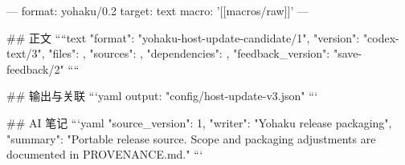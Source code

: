 ---
format: yohaku/0.2
target: text
macro: '[[macros/raw]]'
---

## 正文
````text
{
  "format": "yohaku-host-update-candidate/1",
  "version": "codex-text/3",
  "files": {},
  "sources": {},
  "dependencies": {},
  "feedback_version": "save-feedback/2"
}
````

## 输出与关联
```yaml
output: "config/host-update-v3.json"
```

## AI 笔记
```yaml
{"source_version": 1, "writer": "Yohaku release packaging", "summary": "Portable release source. Scope and packaging adjustments are documented in PROVENANCE.md."}
```
